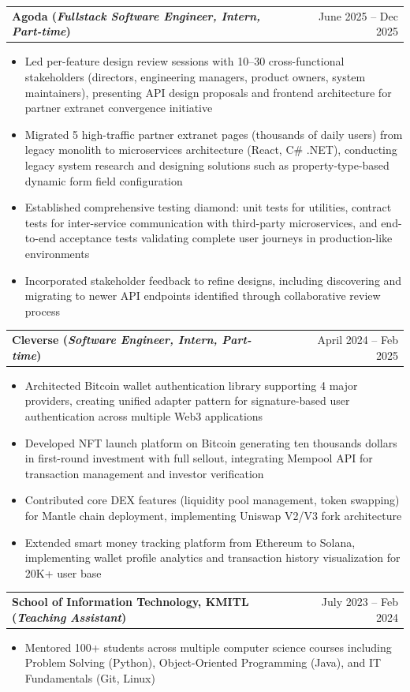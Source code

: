 \documentclass[letterpaper,9pt]{extarticle}
\makeatletter
\newcommand{\entry}[2]{%
  \vspace{0.6ex}%
  \noindent\begin{tabularx}{\textwidth}{@{}X r@{}}
    \textbf{#1} & #2 \\
  \end{tabularx}%
  \vspace{-0.2ex}%
}
\newcommand{\role}[1]{(\textit{#1})}
\makeatother
\begin{document}
\entry{Agoda \role{Fullstack Software Engineer, Intern, Part-time}}{June 2025 -- Dec 2025}
\begin{itemize}
  \item Led per-feature design review sessions with 10--30 cross-functional stakeholders (directors, engineering managers, product owners, system maintainers), presenting API design proposals and frontend architecture for partner extranet convergence initiative
  \item Migrated 5 high-traffic partner extranet pages (thousands of daily users) from legacy monolith to microservices architecture (React, C\# .NET), conducting legacy system research and designing solutions such as property-type-based dynamic form field configuration
  \item Established comprehensive testing diamond: unit tests for utilities, contract tests for inter-service communication with third-party microservices, and end-to-end acceptance tests validating complete user journeys in production-like environments
  \item Incorporated stakeholder feedback to refine designs, including discovering and migrating to newer API endpoints identified through collaborative review process
\end{itemize}

\entry{Cleverse \role{Software Engineer, Intern, Part-time}}{April 2024 -- Feb 2025}
\begin{itemize}
  \item Architected Bitcoin wallet authentication library supporting 4 major providers, creating unified adapter pattern for signature-based user authentication across multiple Web3 applications
  \item Developed NFT launch platform on Bitcoin generating ten thousands dollars in first-round investment with full sellout, integrating Mempool API for transaction management and investor verification
  \item Contributed core DEX features (liquidity pool management, token swapping) for Mantle chain deployment, implementing Uniswap V2/V3 fork architecture
  \item Extended smart money tracking platform from Ethereum to Solana, implementing wallet profile analytics and transaction history visualization for 20K+ user base
\end{itemize}

\entry{School of Information Technology, KMITL \role{Teaching Assistant}}{July 2023 -- Feb 2024}
\begin{itemize}
  \item Mentored 100+ students across multiple computer science courses including Problem Solving (Python), Object-Oriented Programming (Java), and IT Fundamentals (Git, Linux)
\end{itemize}
\end{document}
